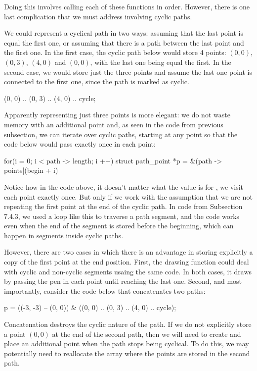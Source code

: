 Doing this involves calling each of these functions in order. However,
there is one last complication that we must address involving cyclic
paths.

We could represent a cyclical path in two ways: assuming that the last
point is equal the first one, or assuming that there is a path between
the last point and the first one. In the first case, the cyclic path
below would store 4 points: $(0, 0)$, $(0, 3)$, $(4, 0)$ and $(0, 0)$,
with the last one being equal the first. In the second case, we would
store just the three points and assume the last one point is connected
to the first one, since the path is marked as cyclic.

\alinhaverbatim
(0, 0) .. (0, 3) .. (4, 0) .. cycle;
\alinhanormal

Apparently representing just three points is more elegant: we do not
waste memory with an additional point and, as seen in the code from
previous subsection, we can iterate over cyclic paths, starting at any
point so that the code below would pass exactly once in each point:

\alinhaverbatim
for(i = 0; i < path -> length; i ++)
  struct path_point *p = &(path -> points[(begin + i) %
\alinhanormal

Notice how in the code above, it doesn't matter what the value is
for , we visit each point exactly once. But only if
we work with the assumption that we are not repeating the first point
at the end of the cyclic path. In code from Subsection 7.4.3, we used
a loop like this to traverse a path segment, and the code works even
when the end of the segment is stored before the beginning, which can
happen in segments inside cyclic paths.

However, there are two cases in which there is an advantage in storing
explicitly a copy of the first point at the end position. First, the
drawing function could deal with cyclic and non-cyclic segments usaing
the same code. In both cases, it draws by passing the pen in each
point until reaching the last one. Second, and most importantly,
consider the code below that concatenates two paths:

\alinhaverbatim
p = ((-3, -3) -- (0, 0)) & ((0, 0) .. (0, 3) .. (4, 0) .. cycle);
\alinhanormal

Concatenation destroys the cyclic nature of the path. If we do not
explicitly store a point $(0, 0)$ at the end of the second path, then
we will need to create and place an additional point when the path
stops being cyclical. To do this, we may potentially need to
reallocate the array where the points are stored in the second path.


